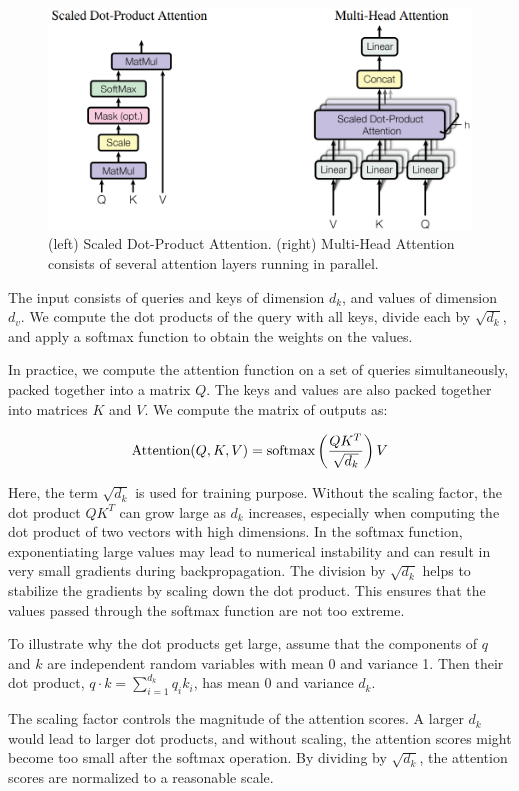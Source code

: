 \documentclass{report}
\begin{document}
\begin{figure}[ht]
	\includegraphics[width=350pt]{56}
	\centering
	\caption{(left) Scaled Dot-Product Attention. (right) Multi-Head Attention consists of several
attention layers running in parallel.}
\end{figure}

The input consists of queries and keys of dimension $d_k$, and values of dimension $d_v$. We compute the dot products of the query with all keys, divide each by $\sqrt{d_k}$, and apply a softmax function to obtain the weights on the values.

In practice, we compute the attention function on a set of queries simultaneously, packed together into a matrix $Q$. The keys and values are also packed together into matrices $K$ and $V$. We compute the matrix of outputs as:

$$\text{Attention}(Q, K, V) = \text{softmax}\left(\frac{QK^T}{\sqrt{d_k}}\right)V$$

Here, the term $\sqrt{d_k}$ is used for training purpose. Without the scaling factor, the dot product $QK^T$ can grow large as $d_k$ increases, especially when computing the dot product of two vectors with high dimensions. In the softmax function, exponentiating large values may lead to numerical instability and can result in very small gradients during backpropagation. The division by $\sqrt{d_k}$ helps to stabilize the gradients by scaling down the dot product. This ensures that the values passed through the softmax function are not too extreme.

To illustrate why the dot products get large, assume that the components of $q$ and $k$ are independent random variables with mean 0 and variance 1. Then their dot product, $q \cdot k = \sum_{i=1}^{d_k} q_i k_i$, has mean 0 and variance $d_k$.

The scaling factor controls the magnitude of the attention scores. A larger $d_k$ would lead to larger dot products, and without scaling, the attention scores might become too small after the softmax operation. By dividing by $\sqrt{d_k}$, the attention scores are normalized to a reasonable scale.
\end{document}
